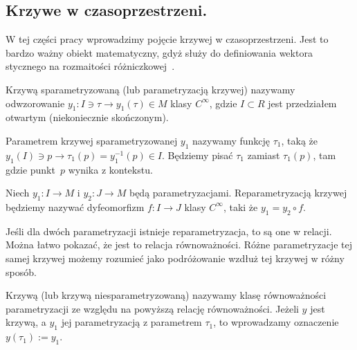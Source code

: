 \subsection{Krzywe w czasoprzestrzeni.}
W tej części pracy wprowadzimy pojęcie krzywej w czasoprzestrzeni. 
Jest to bardzo ważny obiekt matematyczny, gdyż służy do definiowania
wektora stycznego na rozmaitości różniczkowej~\cite{ganca1987}. 
\begin{definition}
Krzywą sparametryzowaną (lub parametryzacją krzywej) nazywamy 
odwzorowanie 
$ y_1 : I \ni \tau \to y_1(\tau) \in M$ klasy $C^\infty$, 
gdzie $I \subset R$ 
jest przedziałem otwartym (niekoniecznie skończonym).
\end{definition}
\begin{definition}
Parametrem krzywej sparametryzowanej $y_1$ 
nazywamy funkcję $\tau_1$, taką że $ y_1(I) \ni p 
\to \tau_1(p) = y_1^{-1}( p )\in I$. 
Będziemy pisać
$\tau_1$ zamiast $\tau_1(p)$, tam gdzie punkt~$p$ 
wynika z kontekstu.
\end{definition}
\begin{definition}
Niech $y_1: I \to M$ i $y_2:J\to M$ będą parametryzacjami.
Reparametryzacją krzywej będziemy nazywać dyfeomorfizm $f : I \to J$
klasy $C^\infty$,
taki że $y_1 = y_2 \circ f$.
\end{definition}
Jeśli dla dwóch parametryzacji istnieje reparametryzacja, to  
są one w relacji. Można łatwo pokazać, że jest to
relacja równoważności. Różne parametryzacje tej samej krzywej 
możemy rozumieć jako podróżowanie wzdłuż tej krzywej w różny sposób.
\begin{definition}
Krzywą (lub krzywą niesparametryzowaną) nazywamy klasę równoważności
parametryzacji ze względu na powyższą relację równoważności.
Jeżeli $y$ jest krzywą, a $y_1$ jej parametryzacją z parametrem $\tau_1$,
to wprowadzamy oznaczenie $y(\tau_1) := y_1$.
\end{definition}
